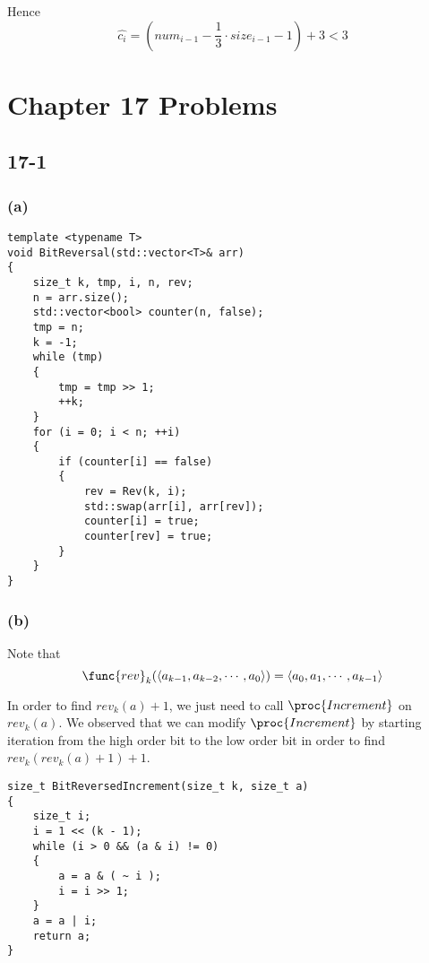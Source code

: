 Hence
\begin{equation*}
    \hat{c_i} = (num_{i-1} - \frac{1}{3} \cdot size_{i-1} - 1) + 3 < 3
\end{equation*}

\section*{Chapter 17 Problems}

\subsection*{17-1}

\subsubsection*{(a)}

\begin{verbatim}
template <typename T>
void BitReversal(std::vector<T>& arr)
{
    size_t k, tmp, i, n, rev;
    n = arr.size();
    std::vector<bool> counter(n, false);
    tmp = n;
    k = -1;
    while (tmp)
    {
        tmp = tmp >> 1;
        ++k;
    }
    for (i = 0; i < n; ++i)
    {
        if (counter[i] == false)
        {
            rev = Rev(k, i);
            std::swap(arr[i], arr[rev]);
            counter[i] = true;
            counter[rev] = true;
        }
    }
}
\end{verbatim}

\subsubsection*{(b)}

Note that
\begin{equation*}
    \func{rev}_k(\langle a_{k-1}, a_{k-2}, \cdots, a_0 \rangle)
     = \langle a_0, a_1, \cdots, a_{k-1} \rangle
\end{equation*}

In order to find $rev_k(a) + 1$, 
we just need to call $\proc{Increment}$ on $rev_k(a)$.
We observed that we can modify $\proc{Increment}$
by starting iteration from the high order bit to the low order bit
in order to find $rev_k( rev_k(a) + 1 ) + 1$.

\begin{verbatim}
size_t BitReversedIncrement(size_t k, size_t a)
{
    size_t i;
    i = 1 << (k - 1);
    while (i > 0 && (a & i) != 0)
    {
        a = a & ( ~ i );
        i = i >> 1;
    }
    a = a | i;
    return a;
}
\end{verbatim}


